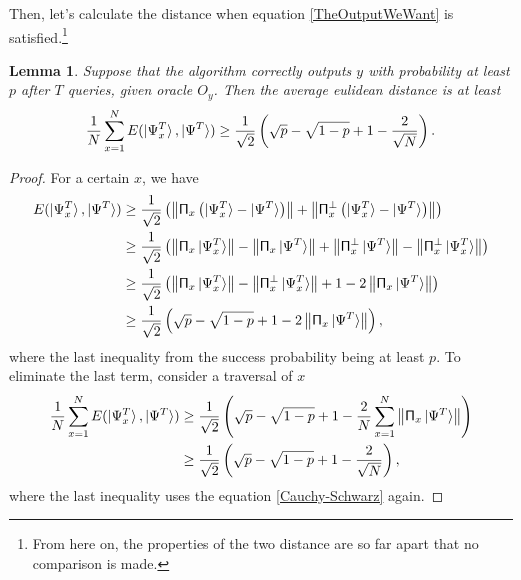 \documentclass[a4paper,10pt]{article}
\newtheorem{lemma}{Lemma}[subsection]
\numberwithin{equation}{subsection}
\begin{document}
Then, let's calculate the distance when equation \ref{TheOutputWeWant} is satisfied.\footnote{From here on, the properties of the two distance are so far apart that no comparison is made.}
\begin{lemma}
    Suppose that the algorithm correctly outputs $y$ with probability at least $p$ after $T$ queries, given oracle $O_{y}$. Then the average eulidean distance is at least
    \begin{equation}
        \frac{1}{N}\sum_{x=1}^{N}E(\ket{\Psi_{x}^{T}},\ket{\Psi^{T}})\geq \frac{1}{\sqrt{2}}\left(\sqrt{p}-\sqrt{1-p}+1-\frac{2}{\sqrt{N}}\right).
    \end{equation}
\end{lemma}
\begin{proof}
    For a certain $x$, we have
    \begin{equation*}
        \begin{split}
            E(\ket{\Psi_{x}^{T}},\ket{\Psi^{T}})
             & \geq \frac{1}{\sqrt{2}}\left(\left\|\mathsf{\Pi}_{x}\left(\ket{\Psi_{x}^{T}}-\ket{\Psi^{T}}\right)\right\|+\left\|\mathsf{\Pi}_{x}^{\perp}\left(\ket{\Psi_{x}^{T}}-\ket{\Psi^{T}}\right)\right\|\right)                                             \\
             & \geq \frac{1}{\sqrt{2}}\left(\left\|\mathsf{\Pi}_{x}\ket{\Psi_{x}^{T}}\right\|-\left\|\mathsf{\Pi}_{x}\ket{\Psi^{T}}\right\|+\left\|\mathsf{\Pi}_{x}^{\perp}\ket{\Psi^{T}}\right\|-\left\|\mathsf{\Pi}_{x}^{\perp}\ket{\Psi_{x}^{T}}\right\|\right) \\
             & \geq \frac{1}{\sqrt{2}}\left(\left\|\mathsf{\Pi}_{x}\ket{\Psi_{x}^{T}}\right\|-\left\|\mathsf{\Pi}_{x}^{\perp}\ket{\Psi_{x}^{T}}\right\|+1-2\left\|\mathsf{\Pi}_{x}\ket{\Psi^{T}}\right\|\right)                                                    \\
             & \geq \frac{1}{\sqrt{2}}\left(\sqrt{p}-\sqrt{1-p}+1-2\left\|\mathsf{\Pi}_{x}\ket{\Psi^{T}}\right\|\right),
        \end{split}
    \end{equation*}
    where the last inequality from the success probability being at least $p$. To eliminate the last term, consider a traversal of $x$
    \begin{equation*}
        \begin{split}
            \frac{1}{N}\sum_{x=1}^{N}E(\ket{\Psi_{x}^{T}},\ket{\Psi^{T}})
             & \geq \frac{1}{\sqrt{2}}\left(\sqrt{p}-\sqrt{1-p}+1-\frac{2}{N}\sum_{x=1}^{N}\left\|\mathsf{\Pi}_{x}\ket{\Psi^{T}}\right\|\right) \\
             & \geq \frac{1}{\sqrt{2}}\left(\sqrt{p}-\sqrt{1-p}+1-\frac{2}{\sqrt{N}}\right),
        \end{split}
    \end{equation*}
    where the last inequality uses the equation \ref{Cauchy-Schwarz} again.
\end{proof}
\end{document}
